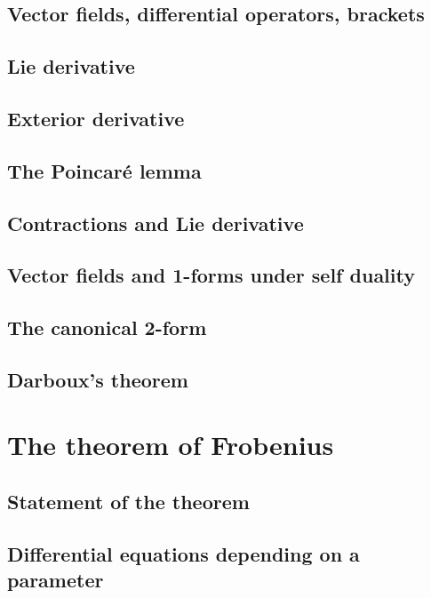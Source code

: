 \documentclass[a4paper]{article}
\begin{document}
\subsection{Vector fields, differential operators, brackets}

\subsection{Lie derivative}

\subsection{Exterior derivative}

\subsection{The Poincar\'e lemma}

\subsection{Contractions and Lie derivative}

\subsection{Vector fields and 1-forms under self duality}

\subsection{The canonical 2-form}

\subsection{Darboux's theorem}

\section{The theorem of Frobenius}

\subsection{Statement of the theorem}

\subsection{Differential equations depending on a parameter}
\end{document}

